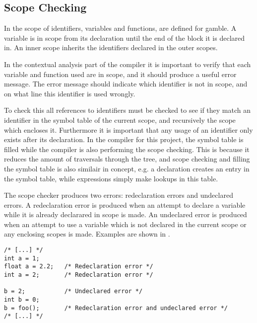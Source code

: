 \subsection*{Scope Checking}
In  the scope of identifiers, variables and functions, are defined for \gls{gamble}.
A variable is in scope from its declaration until the end of the block it is declared in.
An inner scope inherits the identifiers declared in the outer scopes. 

In the contextual analysis part of the compiler it is important to verify that each variable and function used are in scope, and it should produce a useful error message.
The error message should indicate which identifier is not in scope, and on what line this identifier is used wrongly.

To check this all references to identifiers must be checked to see if they match an identifier in the symbol table of the current scope, and recursively the scope which encloses it. 
Furthermore it is important that any usage of an identifier only exists after its declaration.
In the compiler for this project, the symbol table is filled while the compiler is also performing the scope checking.
This is because it reduces the amount of traversals through the tree, and scope checking and filling the symbol table is also similair in concept, e.g. a declaration creates an entry in the symbol table, while expressions simply make lookups in this table.

The scope checker produces two errors: redeclaration errors and undeclared errors.
A redeclaration error is produced when an attempt to declare a variable while it is already declarared in scope is made.
An undeclared error is produced when an attempt to use a variable which is not declared in the current scope or any enclosing scopes is made. 
Examples are shown in .

\begin{lstlisting}[caption=Examples of scope errors in \gls{gamble}, numbers=none,frame=tlrb,label={lst:scopeErrors}]
/* [...] */
int a = 1;
float a = 2.2;   /* Redeclaration error */
int a = 2;       /* Redeclaration error */ 

b = 2;           /* Undeclared error */   
int b = 0;
b = foo();       /* Redeclaration error and undeclared error */ 
/* [...] */
\end{lstlisting}
                         
